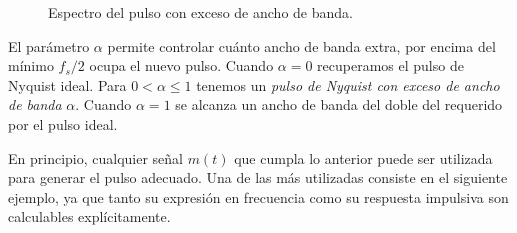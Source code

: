\begin{figure}
\begin{center}
        \caption{Espectro del pulso con exceso de ancho de banda.}\label{fig:excess bw}
    \end{center}
\end{figure}

El parámetro $\alpha$ permite controlar cuánto ancho de banda extra, por encima del mínimo $f_s/2$ ocupa el nuevo pulso. Cuando $\alpha=0$ recuperamos el pulso de Nyquist ideal. Para $0<\alpha\leqslant 1$ tenemos un \emph{pulso de Nyquist con exceso de ancho de banda} $\alpha$. Cuando $\alpha=1$ se alcanza un ancho de banda del doble del requerido por el pulso ideal.

En principio, cualquier señal $m(t)$ que cumpla lo anterior puede ser utilizada para generar el pulso adecuado. Una de las más utilizadas consiste en el siguiente ejemplo, ya que tanto su expresión en frecuencia como su respuesta impulsiva son calculables explícitamente.

